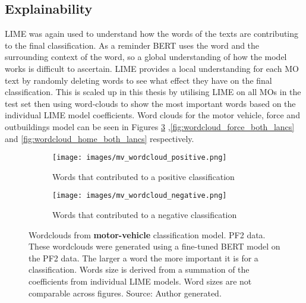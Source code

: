 \subsection{Explainability} LIME was again used to understand how the words of the texts are contributing to the final classification. As a reminder BERT uses the word and the surrounding context of the word, so a global understanding of how the model works is difficult to ascertain. LIME provides a local understanding for each MO text by randomly deleting words to see what effect they have on the final classification. This is scaled up in this thesis by utilising LIME on all MOs in the test set then using word-clouds to show the most important words based on the individual LIME model coefficients. Word clouds for the motor vehicle, force and outbuildings model can be seen in Figures \ref{fig:wordcloud_mv_both_lancs} ,\ref{fig:wordcloud_force_both_lancs} and \ref{fig:wordcloud_home_both_lancs} respectively.

\begin{figure}
     \centering
     \begin{subfigure}[b]{0.9\textwidth}
         \centering
         \texttt{[image: images/mv\_wordcloud\_positive.png]}
         \caption{Words that contributed to a positive classification}
         \label{fig: wordcloud_mv_lancs}
     \end{subfigure}
     \vfill
     \begin{subfigure}[b]{0.9\textwidth}
         \centering
         \texttt{[image: images/mv\_wordcloud\_negative.png]}
         \caption{Words that contributed to a negative classification}
         \label{fig: wordcloud_mv_rev_lancs}
     \end{subfigure}
        \caption[Wordclouds from  \textbf{motor-vehicle} classification model. PF2 data.]{{Wordclouds from  \textbf{motor-vehicle} classification model. PF2 data.} These wordclouds were generated using a fine-tuned BERT model on the PF2 data. The larger a word the more important it is for a classification. Words size is derived from a summation of the coefficients from individual LIME models. Word sizes are not comparable across figures. Source: Author generated.}
        \label{fig:wordcloud_mv_both_lancs}
        
\end{figure}


